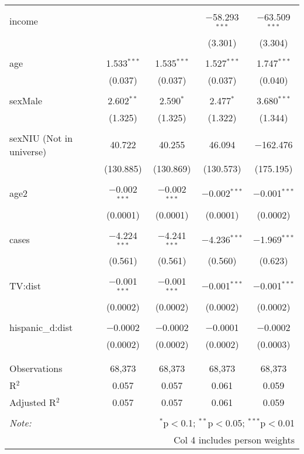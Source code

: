 \begin{table}[!htbp]
\begin{tabular}{@{\extracolsep{-5pt}}lcccc}
  & & & & \\ 
 income &  &  & $-$58.293$^{***}$ & $-$63.509$^{***}$ \\ 
  &  &  & (3.301) & (3.304) \\ 
  & & & & \\ 
 age & 1.533$^{***}$ & 1.535$^{***}$ & 1.527$^{***}$ & 1.747$^{***}$ \\ 
  & (0.037) & (0.037) & (0.037) & (0.040) \\ 
  & & & & \\ 
 sexMale & 2.602$^{**}$ & 2.590$^{*}$ & 2.477$^{*}$ & 3.680$^{***}$ \\ 
  & (1.325) & (1.325) & (1.322) & (1.344) \\ 
  & & & & \\ 
 sexNIU (Not in universe) & 40.722 & 40.255 & 46.094 & $-$162.476 \\ 
  & (130.885) & (130.869) & (130.573) & (175.195) \\ 
  & & & & \\ 
 age2 & $-$0.002$^{***}$ & $-$0.002$^{***}$ & $-$0.002$^{***}$ & $-$0.001$^{***}$ \\ 
  & (0.0001) & (0.0001) & (0.0001) & (0.0002) \\ 
  & & & & \\ 
 cases & $-$4.224$^{***}$ & $-$4.241$^{***}$ & $-$4.236$^{***}$ & $-$1.969$^{***}$ \\ 
  & (0.561) & (0.561) & (0.560) & (0.623) \\ 
  & & & & \\ 
 TV:dist & $-$0.001$^{***}$ & $-$0.001$^{***}$ & $-$0.001$^{***}$ & $-$0.001$^{***}$ \\ 
  & (0.0002) & (0.0002) & (0.0002) & (0.0002) \\ 
  & & & & \\ 
 hispanic\_d:dist & $-$0.0002 & $-$0.0002 & $-$0.0001 & $-$0.0002 \\ 
  & (0.0002) & (0.0002) & (0.0002) & (0.0003) \\ 
  & & & & \\ 
\hline \\[-1.8ex] 
Observations & 68,373 & 68,373 & 68,373 & 68,373 \\ 
R$^{2}$ & 0.057 & 0.057 & 0.061 & 0.059 \\ 
Adjusted R$^{2}$ & 0.057 & 0.057 & 0.061 & 0.059 \\ 
\hline 
\hline \\[-1.8ex] 
\textit{Note:}  & \multicolumn{4}{r}{$^{*}$p$<$0.1; $^{**}$p$<$0.05; $^{***}$p$<$0.01} \\ 
 & \multicolumn{4}{r}{Col 4 includes person weights} \\ 
\end{tabular} 
\end{table} 
